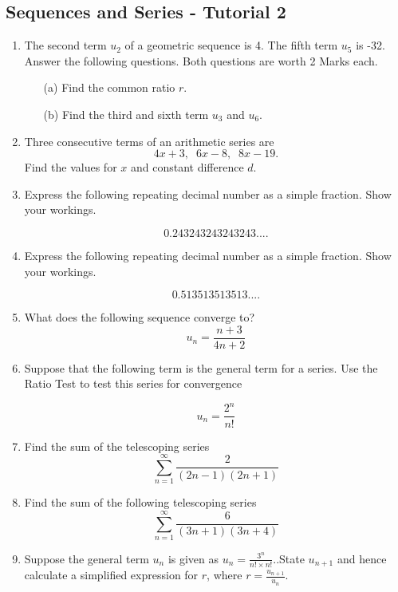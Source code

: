 \documentclass[a4paper,12pt]{article}
\begin{document}
\subsection*{Sequences and Series - Tutorial 2}

\begin{enumerate}
	\item 
	The second term $u_2$ of a geometric sequence is 4. The fifth term $u_5$ is -32. \\  Answer the following questions. Both questions are worth 2 Marks each.
	\begin{itemize}
		\item[(a)] Find the common ratio $r$. 
		\item[(b)] Find the third and sixth term $u_3$ and $u_6$.
	\end{itemize}
	

	
	\item 	Three consecutive terms of an arithmetic series are 
	\[4x+3,\;\;6x-8,\;\;8x-19.\]
	Find the values for $x$ and constant difference $d$.
	
		
		
	\item Express the following repeating decimal number as a simple fraction. Show your workings.
	
	\[0.243243243243243....\]

	
		\item  Express the following repeating decimal number as a simple fraction. Show your workings.
		
		\[0.513513513513....\]
		
		
		\item What does the following sequence converge to?
	\[ u_n  = \frac{n+3}{4n+2}\]
	
	\item  Suppose that the following term is the general term for a series. Use the Ratio Test to test this series for convergence
	
	\[u_n=\frac{2^n}{n!}\]
	
	
	
	\item  Find the sum of the telescoping series  \[ \sum^{\infty}_{n=1} \frac{2
		}{(2n-1)(2n+1)}\]
	

		\item  Find the sum of the following telescoping series
		\[  \sum^{\infty}_{n=1}   \frac{6}{(3n+1)(3n+4)}  \]
		



		\item  Suppose the general term $u_n$ is given as  $u_n = \displaystyle{\frac{3^n}{n! \times n!} } .$.State $u_{n+1}$ and hence calculate a simplified expression for $r$, where 
		{
			\large
		$\displaystyle{ r = \frac{u_{n+1}}{u_n} }$.
		}



\end{enumerate}
\end{document}
